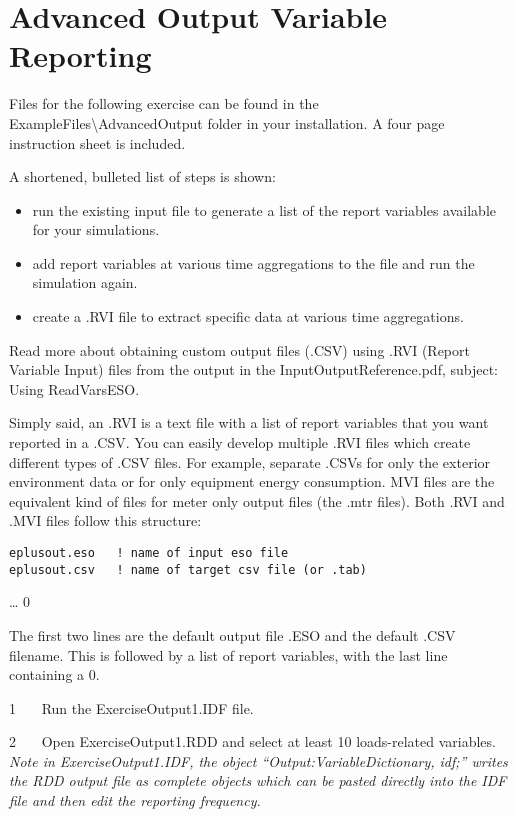 \section{Advanced Output Variable Reporting}\label{advanced-output-variable-reporting}

Files for the following exercise can be found in the ExampleFiles\textbackslash{}AdvancedOutput folder in your installation. A four page instruction sheet is included.

A shortened, bulleted list of steps is shown:

\begin{itemize}
\item
  run the existing input file to generate a list of the report variables available for your simulations.
\item
  add report variables at various time aggregations to the file and run the simulation again.
\item
  create a .RVI file to extract specific data at various time aggregations.
\end{itemize}

Read more about obtaining custom output files (.CSV) using .RVI (Report Variable Input) files from the output in the InputOutputReference.pdf, subject: Using ReadVarsESO.

Simply said, an .RVI is a text file with a list of report variables that you want reported in a .CSV. You can easily develop multiple .RVI files which create different types of .CSV files. For example, separate .CSVs for only the exterior environment data or for only equipment energy consumption. MVI files are the equivalent kind of files for meter only output files (the .mtr files). Both .RVI and .MVI files follow this structure:

\begin{lstlisting}
eplusout.eso   ! name of input eso file
eplusout.csv   ! name of target csv file (or .tab)
\end{lstlisting}

 \ldots{} 0

The first two lines are the default output file .ESO and the default .CSV filename. This is followed by a list of report variables, with the last line containing a 0.

1~~~ Run the ExerciseOutput1.IDF file.

2~~~ Open ExerciseOutput1.RDD and select at least 10 loads-related variables. \emph{Note in ExerciseOutput1.IDF, the object ``Output:VariableDictionary, idf;'' writes the RDD output file as complete objects which can be pasted directly into the IDF file and then edit the reporting frequency.}

